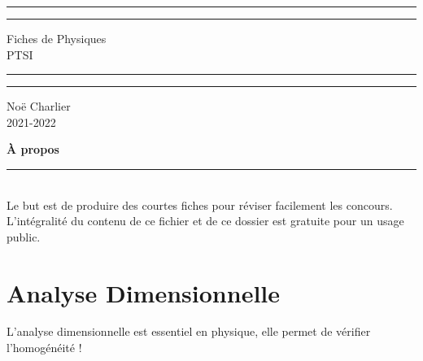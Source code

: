 \documentclass[12pt,hidelinks]{article}
\begin{document}
\begin{titlepage}
	\centering %
	\scshape %
	\vspace*{1.5\baselineskip} %

	\rule{13cm}{1.6pt}\vspace*{-\baselineskip}\vspace*{2pt} %
	\rule{13cm}{0.4pt} %
	
		\vspace{0.75\baselineskip} %
	{	\Huge Fiches de Physiques\\ 
			\vspace{4mm}
		   PTSI \\	}
		\vspace{0.75\baselineskip} %
	\rule{13cm}{0.4pt}\vspace*{-\baselineskip}\vspace{3.2pt} %
	\rule{13cm}{1.6pt} %
	
		\vspace{1.75\baselineskip} %
	{\large Noë Charlier \\
		\vspace*{1.2\baselineskip}
	2021-2022} \\
	\vfill
\end{titlepage}
\tableofcontents
\vfill
\small{\noindent \textbf{À propos} \vspace{-3mm}\\
\noindent \rule{3.3cm}{0.5pt} \\
Le but est de produire des courtes fiches pour réviser facilement les concours.\\
L'intégralité du contenu de ce fichier et de ce dossier est gratuite pour un usage public.}
\newpage
{}
\section{Analyse Dimensionnelle}
\vspace{3cm}
	L'analyse dimensionnelle est essentiel en physique, elle permet de vérifier l'homogénéité !
\end{document}

